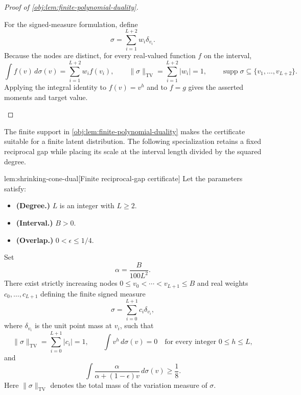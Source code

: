 \documentclass[11pt]{article}
\begin{document}
\begin{proof}[Proof of \cref{obj:lem:finite-polynomial-duality}]
\begin{enumerate}
For the signed-measure formulation, define
\[
\sigma=\sum_{i=1}^{L+2}w_i\delta_{v_i}.
\]
Because the nodes are distinct, for every real-valued function \(f\) on the interval,
\[
\int f(v)\,d\sigma(v)=\sum_{i=1}^{L+2}w_if(v_i),
\qquad
\|\sigma\|_{\mathrm{TV}}=\sum_{i=1}^{L+2}|w_i|=1,
\qquad
\operatorname{supp}\sigma\subseteq\{v_1,\ldots,v_{L+2}\}.
\]
Applying the integral identity to \(f(v)=v^h\) and to \(f=g\) gives the asserted moments and target value.
\end{enumerate}
\end{proof}
\endgroup

The finite support in \cref{obj:lem:finite-polynomial-duality} makes the certificate suitable for a finite latent distribution. The following specialization retains a fixed reciprocal gap while placing its scale at the interval length divided by the squared degree.

\begin{lemmav}{lem:shrinking-cone-dual}[Finite reciprocal-gap certificate]
Let the parameters satisfy:
\begin{itemize}
\item \textbf{(Degree.)} \(L\) is an integer with \(L\ge 2\).
\item \textbf{(Interval.)} \(B>0\).
\item \textbf{(Overlap.)} \(0<\epsilon\le 1/4\).
\end{itemize}
Set
\[
\alpha=\frac{B}{100L^2}.
\]
There exist strictly increasing nodes \(0\le v_0<\cdots<v_{L+1}\le B\) and real weights \(c_0,\ldots,c_{L+1}\) defining the finite signed measure
\[
\sigma=\sum_{i=0}^{L+1}c_i\delta_{v_i},
\]
where \(\delta_{v_i}\) is the unit point mass at \(v_i\), such that
\[
\|\sigma\|_{\mathrm{TV}}
=\sum_{i=0}^{L+1}|c_i|=1,
\qquad
\int v^h\,d\sigma(v)=0
\quad\text{for every integer }0\le h\le L,
\]
and
\[
\int\frac{\alpha}{\alpha+(1-\epsilon)v}\,d\sigma(v)
\ge\frac18.
\]
Here \(\|\sigma\|_{\mathrm{TV}}\) denotes the total mass of the variation measure of \(\sigma\).
\end{lemmav}
\end{document}
